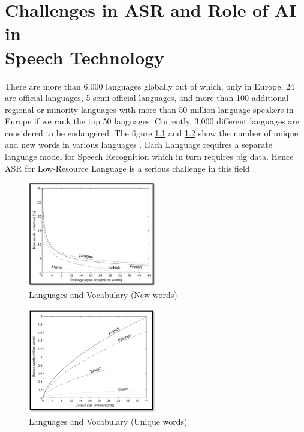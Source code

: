 
\chapter{Challenges in ASR and Role of AI in \\ Speech Technology}    %
\label{cha:why_asr_difficult}

There are more than 6,000 languages globally out of which, only in Europe, 24 are official languages, 5 semi-official languages, and more than 100 additional regional or minority languages with more than 50 million language speakers in Europe if we rank the top 50 languages. Currently, 3,000 different languages are considered to be endangered. The figure \ref{fig:lang-vocab-1} and \ref{fig:lang-vocab-2} show the number of unique and new words in various languages \cite{creutz_morph-based_2007}. Each Language requires a separate language model for Speech Recognition which in turn requires big data. Hence ASR for Low-Resource Language is a serious challenge in this field \cite{besacier_automatic_2014}. 

\begin{figure}[h]
    \centering
    \includegraphics[width=0.5\textwidth]{img/Creutz.png}
    \caption{Languages and Vocabulary (New words) \cite{creutz_morph-based_2007}}
    \label{fig:lang-vocab-1}
\end{figure}

\begin{figure}[h]
    \centering
    \includegraphics[width=0.5\textwidth]{img/Creutz2.png}
    \caption{Languages and Vocabulary (Unique words) \cite{creutz_morph-based_2007}}
    \label{fig:lang-vocab-2}
\end{figure}

